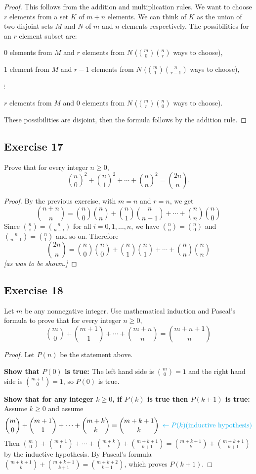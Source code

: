 \documentclass[14pt]{extarticle}
\newcommand{\from}{\leftarrow}
\newcommand{\cy}{\color{cyan}}
\begin{document}
\begin{proof}
This follows from the addition and multiplication rules. We want to choose \(r\) elements from a set \(K\) of \(m+n\) 
elements. We can think of \(K\) as the union of two disjoint sets \(M\) and \(N\) of \(m\) and \(n\) elements respectively. 
The possibilities for an \(r\) element subset are:

0 elements from \(M\) and \(r\) elements from \(N\) (\(\binom{m}{0}\binom{n}{r}\) ways to choose),

1 element from \(M\) and \(r-1\) elements from \(N\) (\(\binom{m}{1}\binom{n}{r-1}\) ways to choose),

\(\vdots\)

\(r\) elements from \(M\) and 0 elements from \(N\) (\(\binom{m}{r}\binom{n}{0}\) ways to choose).

These possibilities are disjoint, then the formula follows by the addition rule.
\end{proof}

\subsection{Exercise 17}
Prove that for every integer \(n \geq 0\),
\[
\binom{n}{0}^2 + \binom{n}{1}^2 + \cdots + \binom{n}{n}^2 = \binom{2n}{n}.
\]
\begin{proof}
By the previous exercise, with \(m=n\) and \(r=n\), we get
\[
\binom{n+n}{n} = \binom{n}{0}\binom{n}{n} + \binom{n}{1}\binom{n}{n-1} + \cdots + \binom{n}{n}\binom{n}{0}
\]
Since \(\binom{n}{i} = \binom{n}{n-i}\) for all \(i = 0, 1, \ldots, n\), we have \(\binom{n}{n} = \binom{n}{0}\) and
\(\binom{n}{n-1} = \binom{n}{1}\) and so on. Therefore
\[
\binom{2n}{n} = \binom{n}{0}\binom{n}{0} + \binom{n}{1}\binom{n}{1} + \cdots + \binom{n}{n}\binom{n}{n}
\]
{\it [as was to be shown.]}
\end{proof}

\subsection{Exercise 18}
Let \(m\) be any nonnegative integer. Use mathematical induction and Pascal’s formula to prove that for every integer 
\(n \geq 0\),
\[
\binom{m}{0} + \binom{m+1}{1} + \cdots + \binom{m+n}{n} = \binom{m+n+1}{n}
\]
\begin{proof}
Let \(P(n)\) be the statement above.

{\bf Show that \(P(0)\) is true:} The left hand side is \(\binom{m}{0} = 1\) and the right hand side is \(\binom{m+1}
{0} = 1\), so \(P(0)\) is true.

{\bf Show that for any integer \(k \geq 0\), if \(P(k)\) is true then \(P(k+1)\) is true:} Assume \(k \geq 0\) and assume
\[
\binom{m}{0} + \binom{m+1}{1} + \cdots + \binom{m+k}{k} = \binom{m+k+1}{k} \,\,\, {\cy \from P(k) \text{(inductive hypothesis)}}
\]
Then \(\binom{m}{0} + \binom{m+1}{1} + \cdots + \binom{m+k}{k}+ \binom{m+k+1}{k+1} = \binom{m+k+1}{k} + \binom{m+k+1}{k+1}\)
by the inductive hypothesis. By Pascal's formula \(\binom{m+k+1}{k} + \binom{m+k+1}{k+1} = \binom{m+k+2}{k+1}\),
which proves \(P(k+1)\).
\end{proof}
\end{document}
